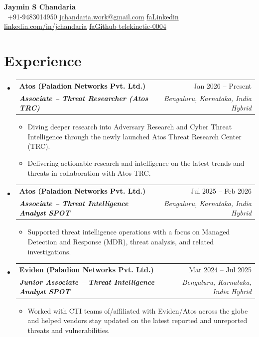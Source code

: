 \documentclass[letterpaper,11pt]{article}
\makeatletter
\newcommand{\EmployerStyle}{\bfseries} %
\newcommand{\EmployerSize}{}           %
\renewcommand{\EmployerSize}{\large} %
\newcommand{\resumeItem}[1]{%
  \item \small #1%
}
\newcommand{\resumeSubheading}[4]{%
  \vspace{1pt}\item
  \begin{tabularx}{0.98\textwidth}[t]{@{}Xr@{}}
    {\EmployerSize\EmployerStyle #1} & {\small #2} \\
    {\itshape\footnotesize #3} & {\itshape\footnotesize #4} \\
  \end{tabularx}\vspace{-3pt}%
}
\newcommand{\resumeSubHeadingListStart}{%
  \begin{itemize}[leftmargin=0.15in, label={}, topsep=2pt, partopsep=0pt]%
}
\newcommand{\resumeSubHeadingListEnd}{\end{itemize}}
\newcommand{\resumeItemListStart}{\begin{itemize}[leftmargin=*, itemsep=3pt, topsep=3pt]}
\newcommand{\resumeItemListEnd}{\end{itemize}\vspace{-3pt}}
\newcommand{\seticon}[1]{\textcolor{Black}{\csname #1\endcsname}}
\makeatother
\begin{document}
\begin{center}
    \textbf{\Huge Jaymin S Chandaria} \\ \vspace{1pt}
     \ \small +91-9483014950 \quad
    \href{mailto:jchandaria.work@gmail.com}{ \underline{jchandaria.work@gmail.com}} \quad
    \href{https://www.linkedin.com/in/jchandaria}{\seticon{faLinkedin} \underline{linkedin.com/in/jchandaria}} \quad
    \href{https://github.com/telekinetic-0004}{\seticon{faGithub} \underline{telekinetic-0004}}
\end{center}

\section{Experience}
\resumeSubHeadingListStart

\resumeSubheading
  {Atos (Paladion Networks Pvt. Ltd.)}{Jan 2026 -- Present}
  {\bfseries Associate -- Threat Researcher (Atos TRC)}{Bengaluru, Karnataka, India \textbar{} Hybrid}
  \resumeItemListStart
    \resumeItem{Diving deeper research into Adversary Research and Cyber Threat Intelligence through the newly launched Atos Threat Research Center (TRC).}
    \resumeItem{Delivering actionable research and intelligence on the latest trends and threats in collaboration with Atos TRC.}
  \resumeItemListEnd

\resumeSubheading
  {Atos (Paladion Networks Pvt. Ltd.)}{Jul 2025 -- Feb 2026}
  {\bfseries Associate -- Threat Intelligence Analyst {\scriptsize \faIcon{star} SPOT}}{Bengaluru, Karnataka, India \textbar{} Hybrid}
  \resumeItemListStart
    \resumeItem{Supported threat intelligence operations with a focus on Managed Detection and Response (MDR), threat analysis, and related investigations.}
  \resumeItemListEnd

\resumeSubheading
  {Eviden (Paladion Networks Pvt. Ltd.)}{Mar 2024 -- Jul 2025}
  {\bfseries Junior Associate -- Threat Intelligence Analyst {\scriptsize \faIcon{star}\faIcon{star} SPOT}}{Bengaluru, Karnataka, India \textbar{} Hybrid}
  \resumeItemListStart
    \resumeItem{Worked with CTI teams of/affiliated with Eviden/Atos across the globe and helped vendors stay updated on the latest reported and unreported threats and vulnerabilities.}
  \resumeItemListEnd

\resumeSubHeadingListEnd

\end{document}
